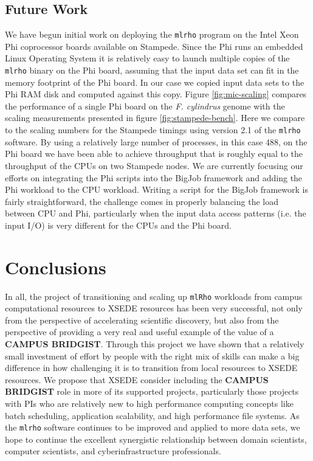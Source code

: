 \documentclass{sig-alternate}
\newcommand{\ty}{\texttt}
\begin{document}
\subsection{Future Work}
We have begun initial work on deploying the \ty{mlrho} program on the Intel Xeon Phi coprocessor boards
available on Stampede. Since the Phi runs an embedded Linux Operating System \cite{xeon_phi}
it is relatively easy to launch multiple copies of the \ty{mlrho} binary on the Phi board, assuming
that the input data set can fit in the memory footprint of the Phi board. In our case we copied input data
sets to the Phi RAM disk and computed against this copy. Figure \ref{fig:mic-scaling} compares the performance
of a single Phi board on the {\it F. cylindrus} genome with the scaling measurements presented in figure
\ref{fig:stampede-bench}. Here we compare to the scaling numbers for the Stampede timings using version 2.1 of
the \ty{mlrho} software. By using a relatively large number of processes, in this case 488, on the Phi board
we have been able to achieve throughput that is roughly equal to the throughput of the CPUs on two Stampede
nodes. We are currently focusing our efforts on integrating the Phi scripts into the BigJob framework and
adding the Phi workload to the CPU workload. Writing a script for the BigJob framework is fairly
straightforward, the challenge comes in properly balancing the load between CPU and Phi, particularly when the
input data access patterns (i.e. the input I/O) is very different for the CPUs and the Phi board.

\section{Conclusions}\label{sec:conclusion}

In all, the project of transitioning and scaling up \ty{mlRho} workloads from campus computational resources
to XSEDE resources has been very successful, not only from the perspective of accelerating scientific
discovery, but also from the perspective of providing a very real and useful example of the value of a {\bf
  CAMPUS BRIDGIST}. Through this project we have shown that a relatively small investment of effort by people
with the right mix of skills can make a big difference in how challenging it is to transition from local
resources to XSEDE resources. We propose that XSEDE consider including the {\bf CAMPUS BRIDGIST} role in more
of its supported projects, particularly those projects with PIs who are relatively new to high performance
computing concepts like batch scheduling, application scalability, and high performance file systems. As the
\ty{mlrho} software continues to be improved and applied to more data sets, we hope to continue the excellent
synergistic relationship between domain scientists, computer scientists, and cyberinfrastructure
professionals.
\end{document}
